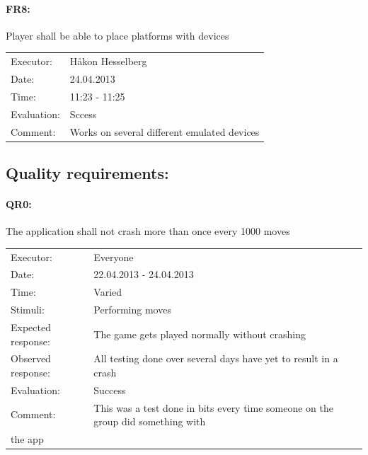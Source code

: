 \documentclass[12pt, a4paper]{article}
\begin{document}
\paragraph{FR8:} Player shall be able to place platforms with devices\\
\begin{tabular}{  p{}  p{} }
    Executor: & Håkon Hesselberg  \\
    Date: & 24.04.2013 \\
    Time: & 11:23 - 11:25  \\
    Evaluation: & Sccess \\
	Comment: &
Works on several different emulated devices \\
\end{tabular}

\subsection{Quality requirements:}
\paragraph{QR0:} The application shall not crash more than once every 1000
moves\\
\begin{tabular}{  p{}  p{} }
    Executor: & Everyone \\
    Date: & 22.04.2013 - 24.04.2013 \\
    Time: & Varied \\
    Stimuli: & Performing moves \\
    Expected response: & The game gets played normally without crashing \\
    Observed response: & All testing done over several days have yet to result in a crash \\
    Evaluation: & Success \\
    Comment: & This was a test done in bits every time someone on the group did something with \\
the app \\
\end{tabular}
\end{document}
